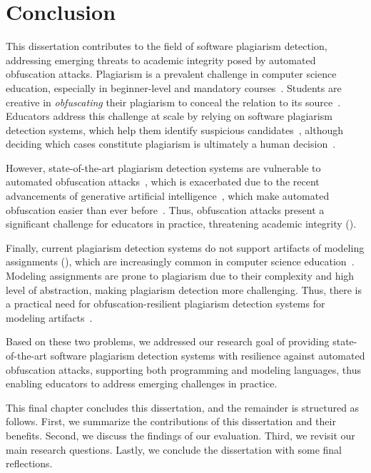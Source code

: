 \chapter{Conclusion}\label{cha:conclusion}
This dissertation contributes to the field of software plagiarism detection, addressing emerging threats to academic integrity posed by automated obfuscation attacks.
%
Plagiarism is a prevalent challenge in computer science education, especially in beginner-level and mandatory courses~\cite{Cosma2008, Park2003}. Students are creative in \textit{obfuscating} their plagiarism to conceal the relation to its source~\cite{Pawelczak2018}.
Educators address this challenge at scale by relying on software plagiarism detection systems, which help them identify suspicious candidates~\cite{Braumoeller2001, mozgovoy2007}, although deciding which cases constitute plagiarism is ultimately a human decision~\cite{Culwin2001, Weber2019}.

However, state-of-the-art plagiarism detection systems are vulnerable to automated obfuscation attacks~\cite{DevoreMcDonald2020, Foltynek2020, Biderman2022}, which is exacerbated due to the recent advancements of generative artificial intelligence~\cite{ChatGPTGuide, Daun2023}, which make automated obfuscation easier than ever before~\cite{Khalil_Er_2023}.
Thus, obfuscation attacks present a significant challenge for educators in practice, threatening academic integrity ().

Finally, current plagiarism detection systems do not support artifacts of modeling assignments (), which are increasingly common in computer science education~\cite{Ciccozzi2018, Engels2006}. Modeling assignments are prone to plagiarism due to their complexity and high level of abstraction, making plagiarism detection more challenging. Thus, there is a practical need for obfuscation-resilient plagiarism detection systems for modeling artifacts~\cite{Martinez2020}.

Based on these two problems, we addressed our research goal of providing state-of-the-art software plagiarism detection systems with resilience against automated obfuscation attacks, supporting both programming and modeling languages, thus enabling educators to address emerging challenges in practice.

This final chapter concludes this dissertation, and the remainder is structured as follows.
First, we summarize the contributions of this dissertation and their benefits.
Second, we discuss the findings of our evaluation.
Third, we revisit our main research questions.
Lastly, we conclude the dissertation with some final reflections.

